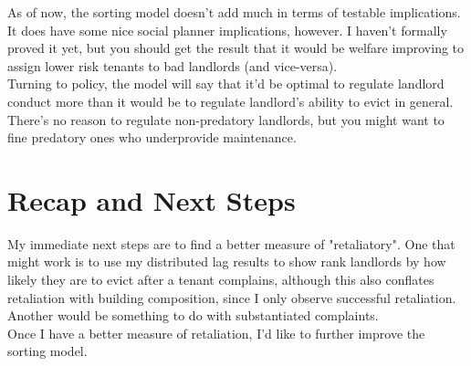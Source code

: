 \documentclass[11pt]{article}
\begin{document}
As of now, the sorting model doesn't add much in terms of testable implications. It does have some nice social planner implications, however. I haven't formally proved it yet, but you should get the result that it would be welfare improving to assign lower risk tenants to bad landlords (and vice-versa).
\\

Turning to policy, the model will say that it'd be optimal to regulate landlord conduct more than it would be to regulate landlord's ability to evict in general. There's no reason to regulate non-predatory landlords, but you might want to fine predatory ones who underprovide maintenance.

\section{Recap and Next Steps}

My immediate next steps are to find a better measure of "retaliatory". One that might work is to use my distributed lag results to show rank landlords by how likely they are to evict after a tenant complains, although this also conflates retaliation with building composition, since I only observe successful retaliation. Another would be something to do with substantiated complaints. 
\\

Once I have a better measure of retaliation, I'd like to further improve the sorting model. 
\end{document}
